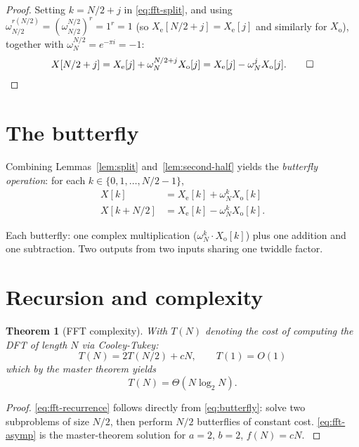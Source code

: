 \documentclass[11pt,a4paper]{article}
\theoremstyle{plain}
\newtheorem{theorem}{Theorem}
\begin{document}
\begin{proof}
Setting $k = N/2 + j$ in \eqref{eq:fft-split}, and using
$\omega_{N/2}^{r(N/2)} = (\omega_{N/2}^{N/2})^r = 1^r = 1$ (so
$X_{\mathrm{e}}[N/2+j] = X_{\mathrm{e}}[j]$ and similarly for $X_{\mathrm{o}}$),
together with $\omega_N^{N/2} = e^{-\pi i} = -1$:
\[
X[N/2+j] = X_{\mathrm{e}}[j] + \omega_N^{N/2+j} X_{\mathrm{o}}[j]
         = X_{\mathrm{e}}[j] - \omega_N^j X_{\mathrm{o}}[j]. \qed
\]
\end{proof}

\section{The butterfly}

Combining Lemmas~\ref{lem:split} and~\ref{lem:second-half} yields the
\emph{butterfly operation}: for each $k \in \{0, 1, \ldots, N/2-1\}$,
\begin{equation}
\label{eq:butterfly}
\begin{aligned}
X[k]       &= X_{\mathrm{e}}[k] + \omega_N^k X_{\mathrm{o}}[k] \\
X[k + N/2] &= X_{\mathrm{e}}[k] - \omega_N^k X_{\mathrm{o}}[k].
\end{aligned}
\end{equation}

Each butterfly: one complex multiplication ($\omega_N^k \cdot X_{\mathrm{o}}[k]$)
plus one addition and one subtraction. Two outputs from two inputs sharing one
twiddle factor.

\section{Recursion and complexity}

\begin{theorem}[FFT complexity]
\label{thm:fft-complexity}
With $T(N)$ denoting the cost of computing the DFT of length $N$ via Cooley-Tukey:
\begin{equation}
\label{eq:fft-recurrence}
T(N) = 2 T(N/2) + cN, \qquad T(1) = O(1)
\end{equation}
which by the master theorem yields
\begin{equation}
\label{eq:fft-asymp}
T(N) = \Theta(N \log_2 N).
\end{equation}
\end{theorem}

\begin{proof}
\eqref{eq:fft-recurrence} follows directly from \eqref{eq:butterfly}: solve
two subproblems of size $N/2$, then perform $N/2$ butterflies of constant cost.
\eqref{eq:fft-asymp} is the master-theorem solution for $a = 2$, $b = 2$,
$f(N) = cN$. \cite{Cooley1965}
\end{proof}
\end{document}
